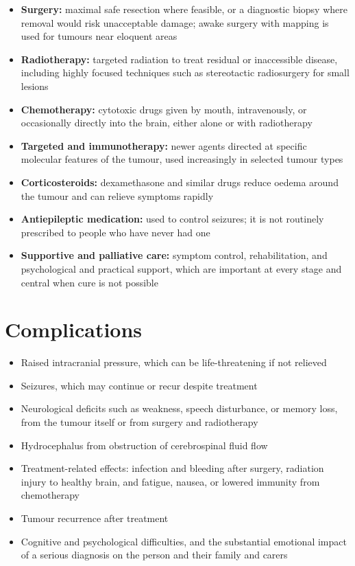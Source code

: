 \begin{itemize}
    \item \textbf{Surgery:} maximal safe resection where feasible, or a diagnostic biopsy where removal would risk unacceptable damage; awake surgery with mapping is used for tumours near eloquent areas
    \item \textbf{Radiotherapy:} targeted radiation to treat residual or inaccessible disease, including highly focused techniques such as stereotactic radiosurgery for small lesions
    \item \textbf{Chemotherapy:} cytotoxic drugs given by mouth, intravenously, or occasionally directly into the brain, either alone or with radiotherapy
    \item \textbf{Targeted and immunotherapy:} newer agents directed at specific molecular features of the tumour, used increasingly in selected tumour types
    \item \textbf{Corticosteroids:} dexamethasone and similar drugs reduce oedema around the tumour and can relieve symptoms rapidly
    \item \textbf{Antiepileptic medication:} used to control seizures; it is not routinely prescribed to people who have never had one
    \item \textbf{Supportive and palliative care:} symptom control, rehabilitation, and psychological and practical support, which are important at every stage and central when cure is not possible
\end{itemize}

\section*{Complications}
\begin{itemize}
    \item Raised intracranial pressure, which can be life-threatening if not relieved
    \item Seizures, which may continue or recur despite treatment
    \item Neurological deficits such as weakness, speech disturbance, or memory loss, from the tumour itself or from surgery and radiotherapy
    \item Hydrocephalus from obstruction of cerebrospinal fluid flow
    \item Treatment-related effects: infection and bleeding after surgery, radiation injury to healthy brain, and fatigue, nausea, or lowered immunity from chemotherapy
    \item Tumour recurrence after treatment
    \item Cognitive and psychological difficulties, and the substantial emotional impact of a serious diagnosis on the person and their family and carers
\end{itemize}

